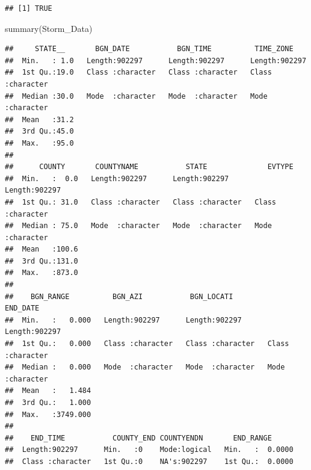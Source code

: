\documentclass[
]{article}
\newenvironment{Shaded}{\begin{snugshade}}{\end{snugshade}}
\newcommand{\FunctionTok}[1]{\textcolor[rgb]{0.00,0.00,0.00}{#1}}
\newcommand{\NormalTok}[1]{#1}
\begin{document}
\begin{verbatim}
## [1] TRUE
\end{verbatim}

\begin{Shaded}
\begin{Highlighting}[]
\FunctionTok{summary}\NormalTok{(Storm\_Data)}
\end{Highlighting}
\end{Shaded}

\begin{verbatim}
##     STATE__       BGN_DATE           BGN_TIME          TIME_ZONE        
##  Min.   : 1.0   Length:902297      Length:902297      Length:902297     
##  1st Qu.:19.0   Class :character   Class :character   Class :character  
##  Median :30.0   Mode  :character   Mode  :character   Mode  :character  
##  Mean   :31.2                                                           
##  3rd Qu.:45.0                                                           
##  Max.   :95.0                                                           
##                                                                         
##      COUNTY       COUNTYNAME           STATE              EVTYPE         
##  Min.   :  0.0   Length:902297      Length:902297      Length:902297     
##  1st Qu.: 31.0   Class :character   Class :character   Class :character  
##  Median : 75.0   Mode  :character   Mode  :character   Mode  :character  
##  Mean   :100.6                                                           
##  3rd Qu.:131.0                                                           
##  Max.   :873.0                                                           
##                                                                          
##    BGN_RANGE          BGN_AZI           BGN_LOCATI          END_DATE        
##  Min.   :   0.000   Length:902297      Length:902297      Length:902297     
##  1st Qu.:   0.000   Class :character   Class :character   Class :character  
##  Median :   0.000   Mode  :character   Mode  :character   Mode  :character  
##  Mean   :   1.484                                                           
##  3rd Qu.:   1.000                                                           
##  Max.   :3749.000                                                           
##                                                                             
##    END_TIME           COUNTY_END COUNTYENDN       END_RANGE       
##  Length:902297      Min.   :0    Mode:logical   Min.   :  0.0000  
##  Class :character   1st Qu.:0    NA's:902297    1st Qu.:  0.0000  

\end{verbatim}
\end{document}
